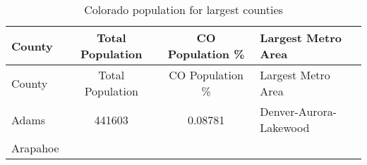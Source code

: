 \documentclass[12pt,twoside]{reedthesis}
\begin{document}
  \begin{longtable}[]{@{}lccl@{}}
  \caption{Colorado population for largest counties
  \label{tab:pop_table}}\tabularnewline
  \toprule
  \begin{minipage}[b]{0.13\columnwidth}\raggedright\strut
  County\strut
  \end{minipage} & \begin{minipage}[b]{0.21\columnwidth}\centering\strut
  Total Population\strut
  \end{minipage} & \begin{minipage}[b]{0.20\columnwidth}\centering\strut
  CO Population \%\strut
  \end{minipage} & \begin{minipage}[b]{0.34\columnwidth}\raggedright\strut
  Largest Metro Area\strut
  \end{minipage}\tabularnewline
  \midrule
  \endfirsthead
  \toprule
  \begin{minipage}[b]{0.13\columnwidth}\raggedright\strut
  County\strut
  \end{minipage} & \begin{minipage}[b]{0.21\columnwidth}\centering\strut
  Total Population\strut
  \end{minipage} & \begin{minipage}[b]{0.20\columnwidth}\centering\strut
  CO Population \%\strut
  \end{minipage} & \begin{minipage}[b]{0.34\columnwidth}\raggedright\strut
  Largest Metro Area\strut
  \end{minipage}\tabularnewline
  \midrule
  \endhead
  \begin{minipage}[t]{0.13\columnwidth}\raggedright\strut
  Adams\strut
  \end{minipage} & \begin{minipage}[t]{0.21\columnwidth}\centering\strut
  441603\strut
  \end{minipage} & \begin{minipage}[t]{0.20\columnwidth}\centering\strut
  0.08781\strut
  \end{minipage} & \begin{minipage}[t]{0.34\columnwidth}\raggedright\strut
  Denver-Aurora-Lakewood\strut
  \end{minipage}\tabularnewline
  \begin{minipage}[t]{0.13\columnwidth}\raggedright\strut
  Arapahoe\strut
  \end{minipage} & \begin{minipage}[t]{0.21\columnwidth}\centering\strut

\end{minipage}
\end{longtable}
\end{document}
